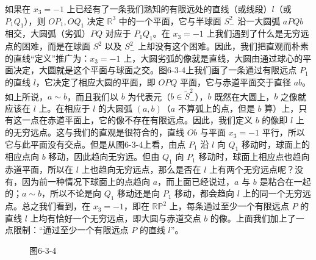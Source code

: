 如果在 $x_3=-1$ 上已经有了一条我们熟知的有限远处的直线（或线段）$l$（或 $P_1Q_1$），则 $OP_1,OQ_1$ 决定 $\mathbb R^3$ 中的一个平面，它与半球面 $S_-^2$ 沿一大圆弧 $aPQb$ 相交，大圆弧（劣弧）$PQ$ 对应于 $P_1Q_1$。在 $x_3=-1$ 上我们遇到了什么是无穷远点的困难，而是在球面 $S^2$ 以及 $S_-^2$ 上却没有这个困难。因此，我们把直观而朴素的直线“定义”推广为：$x_3=-1$ 上，大圆劣弧的像就是直线，大圆由通过球心的平面决定，大圆就是这个平面与球面之交。图6-3-4上我们画了一条通过有限远点 $P_1$ 的直线 $l$，它决定了相应大圆的平面，即 $OPQ$ 平面，它与赤道平面交于直径 $ab$。如上所说，$a\sim b$，而且我们以 $b$ 为代表元（$b\in\widetilde S_-^2$），$b$ 既然在大圆上，$b$ 之像就应该在 $l$ 上。在相应于 $l$ 的大圆弧 $(a,b)$（$a$ 不算弧上的点，但是 $b$ 算）上，只有这一点在赤道平面上，它的像不存在有限远点。因此，我们定义 $b$ 的像即 $l$ 上的无穷远点。这与我们的直观是很符合的，直线 $Ob$ 与平面 $x_3=-1$ 平行，所以它与此平面没有交点。但是从图6-3-4上看，由点 $P_1$ 沿 $l$ 向 $Q_1$ 移动时，球面上的相应点向 $b$ 移动，因此趋向无穷远。但由 $Q_1$ 向 $P_1$ 移动时，球面上相应点也趋向赤道平面，所以在 $l$ 上也趋向无穷远点，那么是否在 $l$ 上有两个无穷远点呢？没有，因为前一种情况下球面上的点趋向 $a$，而上面已经说过，$a$ 与 $b$ 是粘合在一起的；$a\sim b$，所以不论是向 $Q_1$ 移动还是向 $P_1$ 移动，都会趋向 $l$ 上的同一个无穷远点。总之我们看到，在 $x_3=-1$，即在 $\mathbb{RP}^2$ 上，每条通过至少一个有限远点 $P$ 的直线 $l$ 上均有恰好一个无穷远点，即大圆与赤道交点 $b$ 的像。上面我们加上了一点限制：“通过至少一个有限远点 $P$ 的直线 $l$”。

\begin{figure}[htbp]
\centering
{}
\caption{图6-3-4}
\end{figure}

